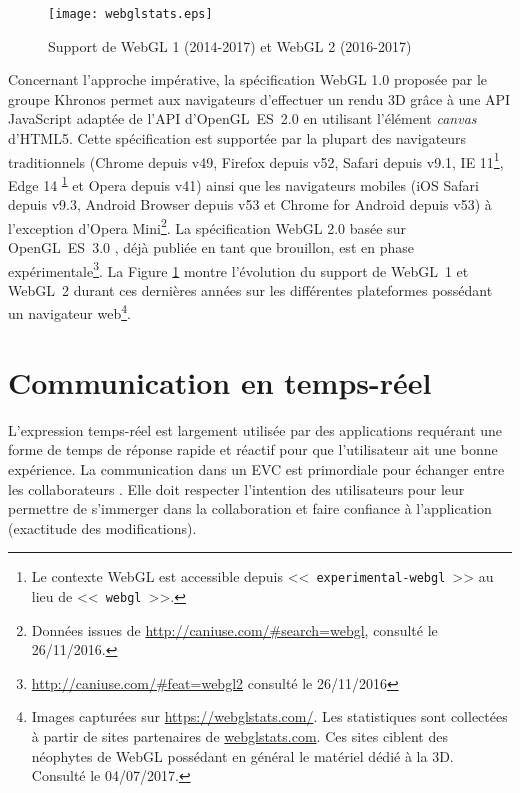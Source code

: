 
\begin{figure}[hbt]
	\centering
	\texttt{[image: webglstats.eps]}
	\caption{Support de WebGL 1 (2014-2017) et WebGL 2 
		(2016-2017)}
	\label{fig:webglstats}
\end{figure}

Concernant l'approche impérative, la spécification WebGL 1.0 \cite{Khronos2011} 
proposée par le groupe Khronos permet aux navigateurs d'effectuer un rendu 3D 
grâce à une \gls{API} JavaScript adaptée de l'\gls{API} d'OpenGL~ES~2.0 
\cite{Khronos2007} en utilisant l'élément \textit{canvas} d'\gls{HTML}5. Cette 
spécification est supportée par la plupart des navigateurs traditionnels (Chrome 
depuis v49, Firefox depuis v52, Safari depuis v9.1, IE 11\footnote{Le contexte 
	WebGL est accessible depuis <<~\texttt{experimental-webgl}~>> au lieu de 
	<<~\texttt{webgl}~>>.\label{fn:webglcontext}}, Edge 14\textsuperscript{ 
	\ref{fn:webglcontext}} et Opera depuis v41) ainsi que les navigateurs mobiles 
	(iOS 
Safari depuis v9.3, Android Browser depuis v53 et Chrome for Android depuis v53) 
à l'exception d'Opera Mini\footnote{Données issues de 
	\url{http://caniuse.com/\#search=webgl}, consulté le 26/11/2016.}. La 
	spécification 
WebGL 2.0 \cite{Khronos2016} basée sur OpenGL~ES~3.0 \cite{Khronos2008}, 
déjà publiée en tant que brouillon, est en phase 
expérimentale\footnote{\url{http://caniuse.com/\#feat=webgl2} consulté le 
	26/11/2016}. La Figure 
\ref{fig:webglstats} montre l'évolution du support de WebGL~1 et WebGL~2 durant 
ces dernières années sur les différentes plateformes possédant un navigateur 
web\footnote{Images capturées sur \url{https://webglstats.com/}. Les statistiques 
	sont collectées à partir de sites partenaires de \url{webglstats.com}. Ces sites 
	ciblent des néophytes de WebGL possédant  en général le matériel 
	dédié à la 3D. Consulté le 04/07/2017.}.

\section{Communication en temps-réel}
L'expression temps-réel est largement utilisée par des applications requérant une 
forme de temps de réponse rapide et réactif pour que l'utilisateur ait une bonne 
expérience. La communication dans un \gls{EVC} est primordiale pour échanger entre les collaborateurs . Elle doit respecter l'intention des utilisateurs pour leur permettre de s'immerger dans la collaboration et faire confiance à l'application (exactitude des modifications).



